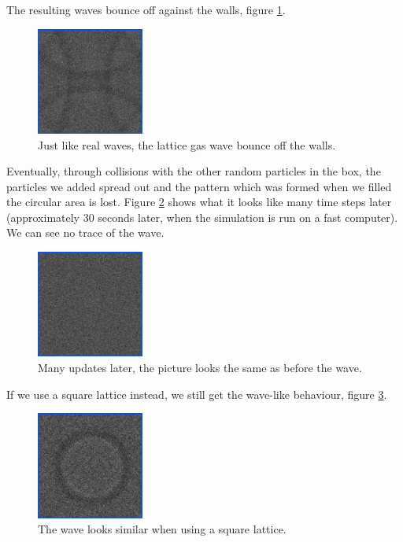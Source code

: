 \documentclass[12pt,a4paper]{article}
\begin{document}
The resulting waves bounce off against the walls, figure \ref{hexwavebounce}.
\begin{figure}[htp]
\centering
  \includegraphics[width=100pt]{figs/hexwavebounce.png}
\caption{Just like real waves, the lattice gas wave bounce off the walls.}
\label{hexwavebounce}
\end{figure}

Eventually, through collisions
with the other random particles in the box, the particles we added spread out and the pattern which was formed
when we filled the circular area is lost. Figure \ref{hexwaveend} shows what it looks like many time
steps later (approximately 30 seconds later, when the simulation is run on a fast computer).
We can see no trace of the wave.

\begin{figure}[htp]
\centering
  \includegraphics[width=100pt]{figs/hexwaveend.png}
\caption{Many updates later, the picture looks the same as before the wave.}
\label{hexwaveend}
\end{figure}



If we use a square lattice instead, we still get the wave-like behaviour, figure \ref{squarewave}.
\begin{figure}[htp]
\centering
  \includegraphics[width=100pt]{figs/squarewave.png}
\caption{The wave looks similar when using a square lattice.}
\label{squarewave}
\end{figure}
\end{document}

